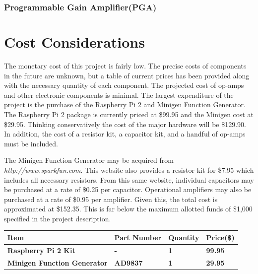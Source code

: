 \documentclass{article}	%
\begin{document}
\begin{multicols}{2}
\subsubsection{Programmable Gain Amplifier(PGA)}


\section{Cost Considerations}
The monetary cost of this project is fairly low. 
The precise costs of components in the future are unknown, but
a table 
of current prices has been provided
along with the necessary quantity of each component.
The projected cost of op-amps and other electronic components is minimal. 
The largest expenditure of the project is
the purchase of the 
Raspberry Pi 2 and 
Minigen Function Generator. 
The Raspberry Pi 2 package is currently priced at \$99.95 and
the Minigen cost at \$29.95.
Thinking conservatively the cost of the major hardware will be \$129.90. 
In addition, the cost of 
a resistor kit, 
a capacitor kit, and 
a handful of op-amps 
must be included.

The Minigen Function Generator may be acquired from 
\textit{http://www.sparkfun.com}.
This website also provides 
a resistor kit for \$7.95 
which includes all necessary resistors. 
From this same website,
individual capacitors may be purchased
at a rate of \$0.25 per capacitor.
Operational amplifiers may also be purchased at
a rate of \$0.95 per amplifier.
Given this,
the total cost is approximated at \$152.35. 
This is far below the maximum allotted funds of \$1,000
specified in the project description.

\begin{center}
    \begin{tabularx}{0.4\textwidth}{|X|X|X|X|}
        \hline

        \textbf{Item} &
        \textbf{Part Number} &
        \textbf{Quantity} &
        \textbf{Price(\$)} \\
        \hline

        \textbf{Raspberry Pi 2 Kit} &
        \textbf{-} &
        \textbf{1} &
        \textbf{99.95} \\
        \hline

        \textbf{Minigen Function Generator} &
        \textbf{AD9837} &
        \textbf{1} &
        \textbf{29.95} \\
        \hline


\end{tabularx}
\end{center}
\end{multicols}
\end{document}
